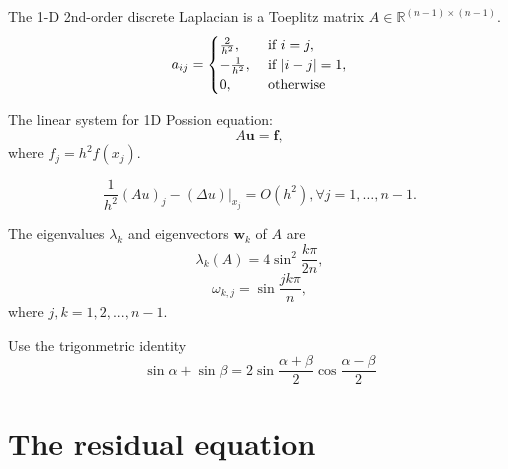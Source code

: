 \begin{defn}
  The 1-D 2nd-order discrete Laplacian
  is a Toeplitz matrix $A\in \mathbb{R}^{(n-1)\times (n-1)}.$
  \begin{equation}\label{eq:discreteLaplacian}
    a_{ij}=
    \begin{cases}
      \frac{2}{h^2},\ &\textmd{if}\ i=j,\\
      -\frac{1}{h^2},\ &\textmd{if}\ \vert i-j\vert=1,\\
       0,\ &\textmd{otherwise}
    \end{cases}
  \end{equation}
\end{defn}

\begin{ntn}
  The linear system for 1D Possion equation:
  \begin{equation}\label{eq:linearSystem-1D}
    A\mathbf{u}=\mathbf{f},
  \end{equation}
where $f_j=h^2f(x_j).$
\end{ntn}

\begin{prop}
  \begin{equation}
    \frac{1}{h^2}(Au)_j-(\Delta u)\vert_{x_j}= O(h^2),
    \forall j=1,\ldots, n-1.
  \end{equation}
\end{prop}

\begin{prop}
  The eigenvalues $\lambda_k$ and eigenvectors $\mathbf{w}_k$
  of $A$ are
  \begin{equation}
    \lambda_k(A)= 4\sin^2\frac{k\pi}{2n},
  \end{equation}
  \begin{equation}
    \omega_{k,j}=\sin \frac{jk\pi}{n},
  \end{equation}
  where $j,k=1,2,...,n-1.$
\end{prop}

\begin{solution}
  Use the trigonmetric identity
  \begin{equation}
    \sin \alpha+\sin \beta = 2 \sin \frac{\alpha + \beta}{2}
    \cos \frac{\alpha - \beta}{2}
  \end{equation}
\end{solution}

\section{The residual equation}

